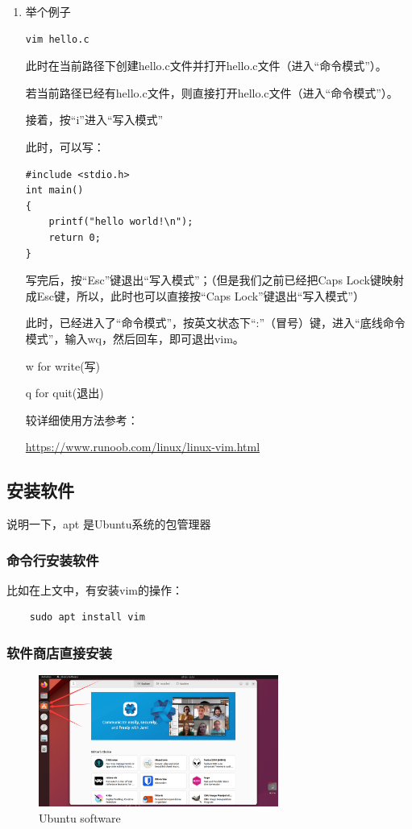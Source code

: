 \documentclass[12pt]{article}
\begin{document}
\begin{enumerate}
\item 举个例子

\begin{verbatim}
vim hello.c
\end{verbatim}

此时在当前路径下创建hello.c文件并打开hello.c文件（进入“命令模式”）。

若当前路径已经有hello.c文件，则直接打开hello.c文件（进入“命令模式”）。

接着，按“i”进入“写入模式”

此时，可以写：
\begin{verbatim}
#include <stdio.h>
int main()
{
    printf("hello world!\n");
    return 0;
}
\end{verbatim}

写完后，按“Esc”键退出“写入模式”；（但是我们之前已经把Caps Lock键映射成Esc键，所以，此时也可以直接按“Caps Lock”键退出“写入模式”）

此时，已经进入了“命令模式”，按英文状态下“:”（冒号）键，进入“底线命令模式”，输入wq，然后回车，即可退出vim。

w for write(写)

q for quit(退出)


较详细使用方法参考：

\href{https://www.runoob.com/linux/linux-vim.html}{https://www.runoob.com/linux/linux-vim.html}

\end{enumerate}


\subsection{安装软件}

说明一下，apt 是Ubuntu系统的包管理器

\subsubsection{命令行安装软件}
比如在上文中，有安装vim的操作：

\begin{verbatim}
    sudo apt install vim
\end{verbatim}

\newpage
\subsubsection{软件商店直接安装}

\begin{figure}[hbt!]
    \centering
    \includegraphics[width=0.7\textwidth]{img/software.png}
    \caption{Ubuntu software}
\end{figure}
\end{document}
